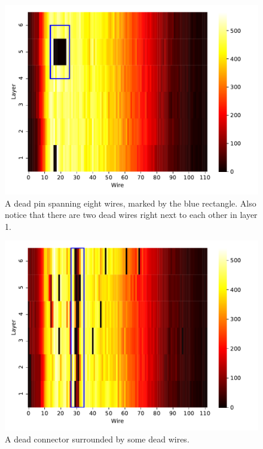 \begin{figure}
  \centering
  \includegraphics[width=\textwidth]{../figures/dead_pin}
  \caption{A dead pin spanning eight wires, marked by the blue
    rectangle. Also notice that
    there are two dead wires right next to each other in layer 1.}
  \label{fig:dead-pin}
\end{figure}

\begin{figure}
  \centering
  \includegraphics[width=\textwidth]{../figures/dead_connector}
  \caption{A dead connector surrounded by some dead wires.}
  \label{fig:dead-connector}
\end{figure}

